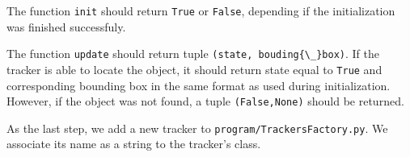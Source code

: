 The function \verb+init+ should return \verb+True+ or \verb+False+, depending
if the initialization was finished successfuly.

The function \verb+update+ should return tuple \verb+(state, bouding{\_}box)+.
If the tracker is able to locate the object, it should return state equal to
\verb+True+ and corresponding bounding box in the same format as used during
initialization. However, if the object was not found, a tuple \verb+(False,None)+
should be returned.

As the last step, we add a new tracker to \verb+program/TrackersFactory.py+. We
associate its name as a string to the tracker's class.
